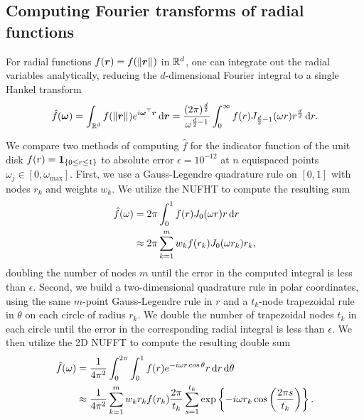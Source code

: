 \subsection{Computing Fourier transforms of radial functions}

For radial functions $f(\bm{r}) = f(\left\Vert\bm{r}\right\Vert_{})$ in $\mathbb{R}^d$, one can integrate
out the radial variables analytically, reducing the $d$-dimensional Fourier
integral to a single Hankel transform
\begin{align} \label{eq:radial-fourier}
    \hat{f}(\bm{\omega}) 
    = \int_{\R^d} f(\norm{\bm{r}}) e^{i\bm{\omega}^\top \bm{r}} \dif{\bm{r}}
    = \frac{(2\pi)^{\frac{d}{2}}}{\omega^{\frac{d}{2} - 1}} \int_0^\infty f(r) J_{\frac{d}{2} - 1}(\omega r) r^{\frac{d}{2}} \dif{r}.
\end{align}

We compare two methods of computing $\hat{f}$ for the indicator function of the
unit disk $f(r) = \bm{1}_{\left\{ 0 \leq r \leq 1\right\}}$ to absolute error $\epsilon = 10^{-12}$
at $n$ equispaced points $\omega_j \in [0, \omega_{\text{max}}]$. First, we use
a Gauss-Legendre quadrature rule on $[0,1]$ with nodes $r_k$ and weights $w_k$.
We utilize the NUFHT to compute the resulting sum
\begin{align}
  \hat{f}(\omega) 
  &= 2\pi\int_0^1 f(r) J_0(\omega r) r \mathop{}\!\mathrm{d}{r} \\
  &\approx 2\pi \sum_{k=1}^m w_k f(r_k) J_0(\omega r_k) r_k,
\end{align}
doubling the number of nodes $m$ until the error in the computed integral is
less than $\epsilon$. Second, we build a two-dimensional quadrature rule in
polar coordinates, using the same $m$-point Gauss-Legendre rule in $r$ and a
$t_k$-node trapezoidal rule in $\theta$ on each circle of radius $r_k$. We
double the number of trapezoidal nodes $t_k$ in each circle until the error in
the corresponding radial integral is less than $\epsilon$. We then utilize the
2D NUFFT to compute the resulting double sum
\begin{align}
  \hat{f}(\omega) 
  &= \frac{1}{4\pi^2} \int_0^{2\pi} \int_0^1 f(r) e^{-i\omega r\cos\theta} r \mathop{}\!\mathrm{d}{r} \mathop{}\!\mathrm{d}{\theta} \\
  &\approx \frac{1}{4\pi^2} \sum_{k=1}^{m} w_k r_k f(r_k) \frac{2\pi}{t_k} \sum_{s=1}^{t_k} \exp\left\{-i\omega r_k\cos\left(\frac{2\pi s}{t_k}\right)\right\}.
\end{align}

